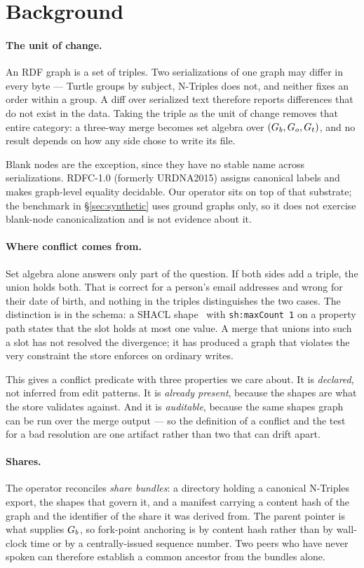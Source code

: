 \section{Background}
\label{sec:background}

\paragraph{The unit of change.} An RDF graph is a set of triples. Two
serializations of one graph may differ in every byte --- Turtle groups by
subject, N-Triples does not, and neither fixes an order within a group. A diff
over serialized text therefore reports differences that do not exist in the
data. Taking the triple as the unit of change removes that entire category:
a three-way merge becomes set algebra over $(G_{b}, G_{o}, G_{t})$, and no
result depends on how any side chose to write its file.

Blank nodes are the exception, since they have no stable name across
serializations. RDFC-1.0 (formerly URDNA2015) assigns canonical labels and makes
graph-level equality decidable. Our operator sits on top of that substrate; the
benchmark in \S\ref{sec:synthetic} uses ground graphs only, so it does not
exercise blank-node canonicalization and is not evidence about it.

\paragraph{Where conflict comes from.} Set algebra alone answers only part of
the question. If both sides add a triple, the union holds both. That is correct
for a person's email addresses and wrong for their date of birth, and nothing in
the triples distinguishes the two cases. The distinction is in the schema: a
SHACL shape~\cite{knublauch2017shacl} with \texttt{sh:maxCount 1} on a property
path states that the slot
holds at most one value. A merge that unions into such a slot has not resolved
the divergence; it has produced a graph that violates the very constraint the
store enforces on ordinary writes.

This gives a conflict predicate with three properties we care about. It is
\emph{declared}, not inferred from edit patterns. It is \emph{already present},
because the shapes are what the store validates against. And it is
\emph{auditable}, because the same shapes graph can be run over the merge output
--- so the definition of a conflict and the test for a bad resolution are one
artifact rather than two that can drift apart.

\paragraph{Shares.} The operator reconciles \emph{share bundles}: a directory
holding a canonical N-Triples export, the shapes that govern it, and a manifest
carrying a content hash of the graph and the identifier of the share it was
derived from. The parent pointer is what supplies $G_{b}$, so fork-point
anchoring is by content hash rather than by wall-clock time or by a
centrally-issued sequence number. Two peers who have never spoken can therefore
establish a common ancestor from the bundles alone.
